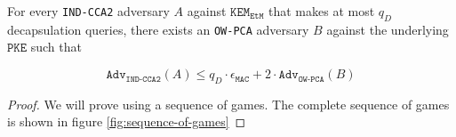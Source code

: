 \documentclass[floatrow,journal=tches,submission]{iacrtrans}
\newcommand{\monospace}{\texttt}
\newcommand{\pke}{\monospace{PKE}}
\newcommand{\kem}{\monospace{KEM}}
\newcommand{\etm}{\monospace{EtM}}  %
\newcommand{\mac}{\monospace{MAC}}
\begin{document}
\begin{theorem}\label{thm:ow-pca-implies-kem-ind-cca2}
    For every \monospace{IND-CCA2} adversary $A$ against $\kem_\etm$ that makes at most $q_D$ decapsulation queries, there exists an \monospace{OW-PCA} adversary $B$ against the underlying $\pke$ such that

    \begin{equation*}
        \monospace{Adv}_\monospace{IND-CCA2}(A) \leq q_D \cdot \epsilon_\mac + 2 \cdot \monospace{Adv}_\monospace{OW-PCA}(B)
    \end{equation*}
\end{theorem}

\begin{proof}
    We will prove using a sequence of games. The complete sequence of games is shown in figure \ref{fig:sequence-of-games}


\end{proof}
\end{document}
